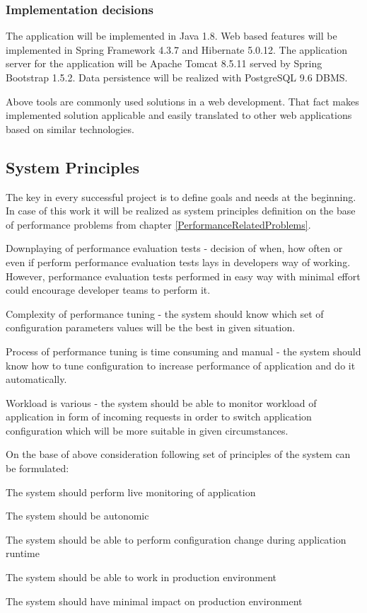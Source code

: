 \documentclass[12pt,a4paper]{article}
\let\tempone\itemize
\let\temptwo\enditemize
\renewenvironment{itemize}{\tempone\addtolength{\itemsep}{-0.4\baselineskip}}{\temptwo}
\begin{document}
\subsubsection{Implementation decisions} 
The application will be implemented in Java 1.8. Web based features will be implemented in Spring Framework 4.3.7 and Hibernate 5.0.12. The application server for the application will be Apache Tomcat 8.5.11 served by Spring Bootstrap 1.5.2. Data persistence will be realized with PostgreSQL 9.6 DBMS.  

Above tools are commonly used solutions in a web development. That fact makes implemented solution applicable and easily translated to other web applications based on similar technologies.  

\subsection{System Principles} \label{principles}
The key in every successful project is to define goals and needs at the beginning.
In case of this work it will be realized as system principles definition on the base of  performance problems from chapter \ref{PerformanceRelatedProblems}.

Downplaying of performance evaluation tests - decision of when, how often or even if perform performance evaluation tests lays in developers way of working. However, performance evaluation tests performed in easy way with minimal effort could encourage developer teams to perform it. 

Complexity of performance tuning - the system should know which set of configuration parameters values will be the best in given situation.  

Process of performance tuning is time consuming and manual - the system should know how to tune configuration to increase performance of application and do it automatically. 

Workload is various - the system should be able to monitor workload of application in form of incoming requests in order to switch application configuration which will be more suitable in given circumstances. 

On the base of above consideration following set of principles of the system can be formulated:

\begin{itemize}
\item The system should perform live monitoring of application
\item The system should be autonomic
\item The system should be able to perform configuration change during application runtime
\item The system should be able to work in production environment
\item The system should have minimal impact on production environment
\end{itemize}
\end{document}
